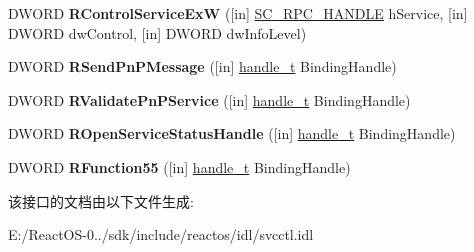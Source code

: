 \begin{DoxyCompactItemize}
\mbox{\label{interfacesvcctl_a4c1c1ca01e72dee4f60b3f3c78194512}} 
D\+W\+O\+RD {\bfseries R\+Control\+Service\+ExW} (\mbox{[}in\mbox{]} \hyperlink{interfacevoid}{S\+C\+\_\+\+R\+P\+C\+\_\+\+H\+A\+N\+D\+LE} h\+Service, \mbox{[}in\mbox{]} D\+W\+O\+RD dw\+Control, \mbox{[}in\mbox{]} D\+W\+O\+RD dw\+Info\+Level)
\item 
\mbox{\label{interfacesvcctl_a0374f36b2c931c99313383df2765210c}} 
D\+W\+O\+RD {\bfseries R\+Send\+Pn\+P\+Message} (\mbox{[}in\mbox{]} \hyperlink{interfacevoid}{handle\+\_\+t} Binding\+Handle)
\item 
\mbox{\label{interfacesvcctl_af1518f86807e432fe2211c03ecee1854}} 
D\+W\+O\+RD {\bfseries R\+Validate\+Pn\+P\+Service} (\mbox{[}in\mbox{]} \hyperlink{interfacevoid}{handle\+\_\+t} Binding\+Handle)
\item 
\mbox{\label{interfacesvcctl_a17166aa4961666eb9d58149c75718af5}} 
D\+W\+O\+RD {\bfseries R\+Open\+Service\+Status\+Handle} (\mbox{[}in\mbox{]} \hyperlink{interfacevoid}{handle\+\_\+t} Binding\+Handle)
\item 
\mbox{\label{interfacesvcctl_a9a20d62d13f20ee2123c40cddcfad422}} 
D\+W\+O\+RD {\bfseries R\+Function55} (\mbox{[}in\mbox{]} \hyperlink{interfacevoid}{handle\+\_\+t} Binding\+Handle)
\end{DoxyCompactItemize}


该接口的文档由以下文件生成\+:\begin{DoxyCompactItemize}
\item 
E\+:/\+React\+O\+S-\/0../sdk/include/reactos/idl/svcctl.\+idl\end{DoxyCompactItemize}
